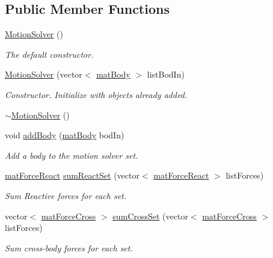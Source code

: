 \subsection*{Public Member Functions}
\begin{DoxyCompactItemize}
\item 
\hypertarget{class_motion_solver_a4dbc64bfeff4aab69a723c142292f787}{\hyperlink{class_motion_solver_a4dbc64bfeff4aab69a723c142292f787}{Motion\-Solver} ()}\label{class_motion_solver_a4dbc64bfeff4aab69a723c142292f787}

\begin{DoxyCompactList}\small\item\em The default constructor. \end{DoxyCompactList}\item 
\hyperlink{class_motion_solver_af5ddc959738154c51b9c877b87670a5b}{Motion\-Solver} (vector$<$ \hyperlink{classmat_body}{mat\-Body} $>$ list\-Bod\-In)
\begin{DoxyCompactList}\small\item\em Constructor. Initialize with objects already added. \end{DoxyCompactList}\item 
\hyperlink{class_motion_solver_ae1fb5f389752a21a6d65ce41599b9b91}{$\sim$\-Motion\-Solver} ()
\item 
void \hyperlink{class_motion_solver_a79603cb6fede30d405f247a4d37256c1}{add\-Body} (\hyperlink{classmat_body}{mat\-Body} bod\-In)
\begin{DoxyCompactList}\small\item\em Add a body to the motion solver set. \end{DoxyCompactList}\item 
\hyperlink{classmat_force_react}{mat\-Force\-React} \hyperlink{class_motion_solver_aa425e77c7aeca6e000a55dc2d0412eeb}{sum\-React\-Set} (vector$<$ \hyperlink{classmat_force_react}{mat\-Force\-React} $>$ list\-Forces)
\begin{DoxyCompactList}\small\item\em Sum Reactive forces for each set. \end{DoxyCompactList}\item 
vector$<$ \hyperlink{classmat_force_cross}{mat\-Force\-Cross} $>$ \hyperlink{class_motion_solver_a927a305ad6782275555b33664241e292}{sum\-Cross\-Set} (vector$<$ \hyperlink{classmat_force_cross}{mat\-Force\-Cross} $>$ list\-Forces)
\begin{DoxyCompactList}\small\item\em Sum cross-\/body forces for each set. \end{DoxyCompactList}\item 

\end{DoxyCompactItemize}

